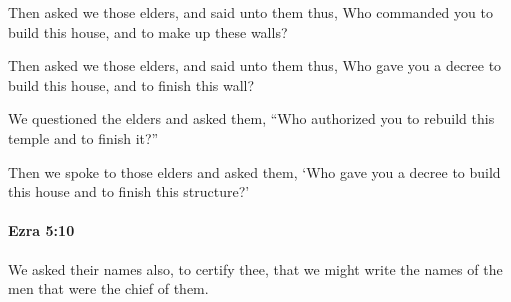 			Then asked we those elders, and said unto them thus, Who commanded you to build this house, and to make up these walls?

			\begin{versebox}
					\item[BHS] 
					\item[LXX] 
					\item[ASV] Then asked we those elders, and said unto them thus, Who gave you a decree to build this house, and to finish this wall?
					\item[NIV] We questioned the elders and asked them, “Who authorized you to rebuild this temple and to finish it?”
					\item[NRSV] Then we spoke to those elders and asked them, ‘Who gave you a decree to build this house and to finish this structure?’
			\end{versebox}

		\paragraph{Ezra 5:10} %
			\label{EZRA-5-10}

			We asked their names also, to certify thee, that we might write the names of the men that were the chief of them.

